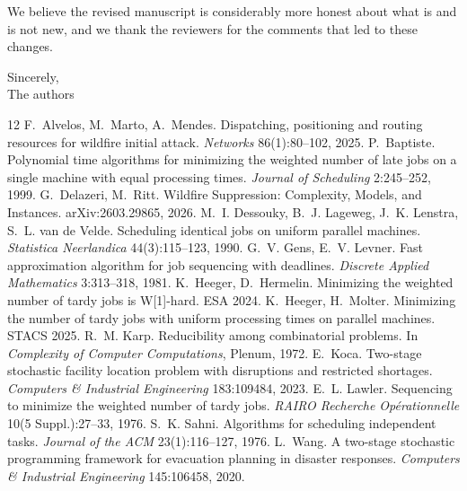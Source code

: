 \documentclass[11pt]{article}
\begin{document}
We believe the revised manuscript is considerably more honest about what
is and is not new, and we thank the reviewers for the comments that led
to these changes.

\bigskip
\noindent Sincerely,\\
The authors


\begin{thebibliography}{12}
 F.~Alvelos, M.~Marto, A.~Mendes. Dispatching, positioning and routing resources for wildfire initial attack. \emph{Networks} 86(1):80--102, 2025.
 P.~Baptiste. Polynomial time algorithms for minimizing the weighted number of late jobs on a single machine with equal processing times. \emph{Journal of Scheduling} 2:245--252, 1999.
 G.~Delazeri, M.~Ritt. Wildfire Suppression: Complexity, Models, and Instances. arXiv:2603.29865, 2026.
 M.~I. Dessouky, B.~J. Lageweg, J.~K. Lenstra, S.~L. van de Velde. Scheduling identical jobs on uniform parallel machines. \emph{Statistica Neerlandica} 44(3):115--123, 1990.
 G.~V. Gens, E.~V. Levner. Fast approximation algorithm for job sequencing with deadlines. \emph{Discrete Applied Mathematics} 3:313--318, 1981.
 K.~Heeger, D.~Hermelin. Minimizing the weighted number of tardy jobs is W[1]-hard. ESA 2024.
 K.~Heeger, H.~Molter. Minimizing the number of tardy jobs with uniform processing times on parallel machines. STACS 2025.
 R.~M. Karp. Reducibility among combinatorial problems. In \emph{Complexity of Computer Computations}, Plenum, 1972.
 E.~Koca. Two-stage stochastic facility location problem with disruptions and restricted shortages. \emph{Computers \& Industrial Engineering} 183:109484, 2023.
 E.~L. Lawler. Sequencing to minimize the weighted number of tardy jobs. \emph{RAIRO Recherche Op\'erationnelle} 10(5 Suppl.):27--33, 1976.
 S.~K. Sahni. Algorithms for scheduling independent tasks. \emph{Journal of the ACM} 23(1):116--127, 1976.
 L.~Wang. A two-stage stochastic programming framework for evacuation planning in disaster responses. \emph{Computers \& Industrial Engineering} 145:106458, 2020.
\end{thebibliography}
\end{document}
